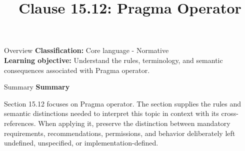 \documentclass[10pt,letterpaper]{article}
\title{Clause 15.12: Pragma Operator}
\author{}
\date{}
\begin{document}
\maketitle
\begin{CornellOverviewBox}{Overview}
\textbf{Classification:} Core language - Normative\\[2pt]
\textbf{Learning objective:} Understand the rules, terminology, and semantic consequences associated with Pragma operator.
\end{CornellOverviewBox}\begin{CornellSummaryBox}{Summary}
{\sffamily\bfseries\color{Accent} Summary}\par\vspace{3pt}Section 15.12 focuses on Pragma operator. The section supplies the rules and semantic distinctions needed to interpret this topic in context with its cross-references. When applying it, preserve the distinction between mandatory requirements, recommendations, permissions, and behavior deliberately left undefined, unspecified, or implementation-defined.
\end{CornellSummaryBox}
\end{document}
